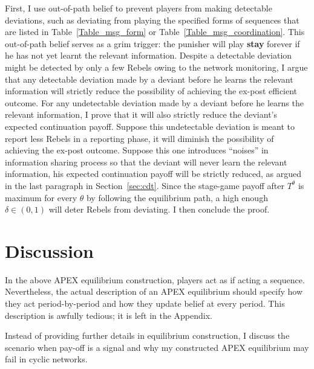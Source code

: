 \documentclass[12pt,letter]{article}
\theoremstyle{definition}
\theoremstyle{remark}
\theoremstyle{claim}
\begin{document}
First, I use out-of-path belief to prevent players from making detectable deviations, such as deviating from playing the specified forms of sequences that are listed in Table~\ref{Table_msg_form} or Table~\ref{Table_msg_coordination}. This out-of-path belief serves as a grim trigger: the punisher will play \textbf{stay} forever if he has not yet learnt the relevant information. Despite a detectable deviation might be detected by only a few Rebels owing to the network monitoring, I argue that any detectable deviation made by a deviant before he learns the relevant information will strictly reduce the possibility of achieving the ex-post efficient outcome. For any undetectable deviation made by a deviant before he learns the relevant information, I prove that it will also strictly reduce the deviant's expected continuation payoff. Suppose this undetectable deviation is meant to report less Rebels in a reporting phase, it will diminish the possibility of achieving the ex-post outcome. Suppose this one introduces ``noises'' in information sharing process so that the deviant will never learn the relevant information, his expected continuation payoff will be strictly reduced, as argued in the last paragraph in Section~\ref{sec:cdt}. Since the stage-game payoff after $T^{\theta}$ is maximum for every $\theta$ by following the equilibrium path, a high enough $\delta\in(0,1)$ will deter Rebels from deviating. I then conclude the proof.

\section{Discussion}
\label{sec:varies}
%
%
In the above APEX equilibrium construction, players act as if acting a sequence. Nevertheless, the actual description of an APEX equilibrium should specify how they act period-by-period and how they update belief at every period. This description is awfully tedious; it is left in the Appendix.

Instead of providing further details in equilibrium construction, I discuss the scenario when pay-off is a signal and why my constructed APEX equilibrium may fail in cyclic networks.
\end{document}
